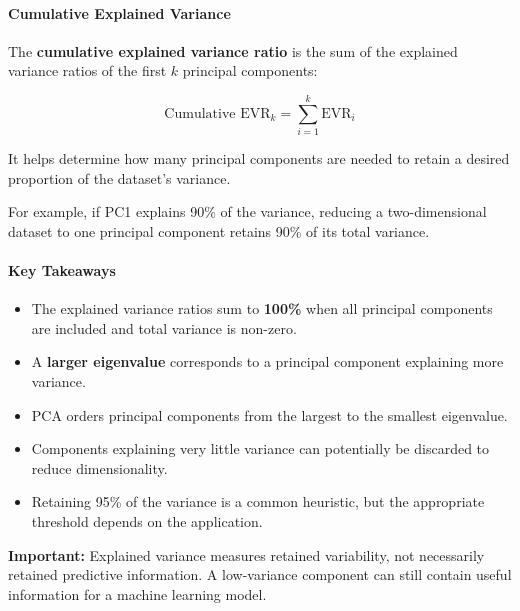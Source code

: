 \documentclass[11pt]{article}
\providecommand{\tightlist}{%
      \setlength{\itemsep}{0pt}\setlength{\parskip}{0pt}}
\begin{document}
\paragraph{Cumulative Explained
Variance}\label{cumulative-explained-variance}

The \textbf{cumulative explained variance ratio} is the sum of the
explained variance ratios of the first \(k\) principal components:

\[
\boxed{\text{Cumulative EVR}_k=\sum_{i=1}^{k}\text{EVR}_i}
\]

It helps determine how many principal components are needed to retain a
desired proportion of the dataset's variance.

For example, if PC1 explains 90\% of the variance, reducing a
two-dimensional dataset to one principal component retains 90\% of its
total variance.

\paragraph{Key Takeaways}\label{key-takeaways}

\begin{itemize}
\tightlist
\item
  The explained variance ratios sum to \textbf{100\%} when all principal
  components are included and total variance is non-zero.
\item
  A \textbf{larger eigenvalue} corresponds to a principal component
  explaining more variance.
\item
  PCA orders principal components from the largest to the smallest
  eigenvalue.
\item
  Components explaining very little variance can potentially be
  discarded to reduce dimensionality.
\item
  Retaining 95\% of the variance is a common heuristic, but the
  appropriate threshold depends on the application.
\end{itemize}

\textbf{Important:} Explained variance measures retained variability,
not necessarily retained predictive information. A low-variance
component can still contain useful information for a machine learning
model.
\end{document}
